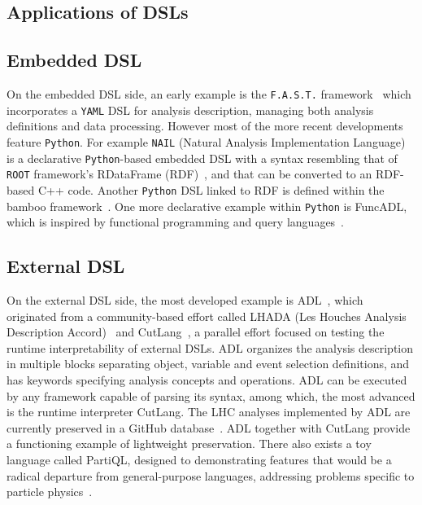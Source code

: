 \documentclass[11pt]{article}
\begin{document}
\begin{appendices}

    \section{Applications of DSLs}
    \label{app:dsl}
    \subsection{Embedded DSL}
    On the embedded \gls{DSL} side, an early example is the \texttt{F.A.S.T.} framework~\cite{FAST} which incorporates a \texttt{YAML} \gls{DSL} for analysis description, managing both analysis definitions and data processing. However most of the more recent developments feature \texttt{Python}. For example \texttt{NAIL} (Natural Analysis Implementation Language)~\cite{NAIL} is a declarative \texttt{Python}-based embedded \gls{DSL} with a syntax resembling that of \texttt{ROOT} framework's RDataFrame (RDF)~\cite{enrico_guiraud_2017_260230}, and that can be converted to an RDF-based C++ code.  Another \texttt{Python} \gls{DSL} linked to RDF is defined within the bamboo framework~\cite{David:2021ohq}.  One more declarative example within \texttt{Python} is FuncADL, which is inspired by functional programming and query languages~\cite{Proffitt:2021wfh}.
    
    \subsection{External DSL}
    On the external \gls{DSL} side, the most developed example is \gls{ADL}~\cite{adlweb, Unel:2021edl}, which originated from a community-based effort called LHADA (Les Houches Analysis Description Accord)~\cite{Brooijmans:2016vro} and CutLang~\cite{Sekmen:2018ehb}, a parallel effort focused on testing the runtime interpretability of external \glspl{DSL}. \gls{ADL} organizes the analysis description in multiple blocks separating object, variable and event selection definitions, and has keywords specifying analysis concepts and operations. 
    \gls{ADL} can be executed by any framework capable of parsing its syntax, among which, the most advanced is the runtime interpreter CutLang. The \gls{LHC} analyses implemented by \gls{ADL} are currently preserved in a GitHub database~\cite{adllhcanl}. \gls{ADL} together with CutLang provide a functioning example of lightweight preservation. There also exists a toy language called PartiQL, designed to demonstrating features that would be a radical departure from general-purpose languages, addressing problems specific to particle physics~\cite{PartiQL}. 
    

\end{appendices}
\end{document}
